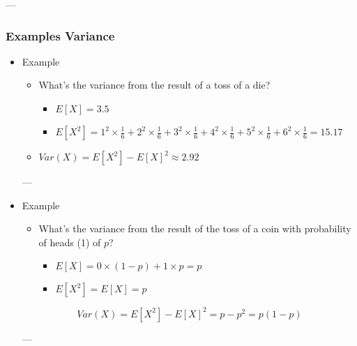 \documentclass[10pt,article]{article}
\begin{document}
---

\subsubsection{Examples Variance}
\label{sec:orgb14281d}
\begin{itemize}
\item Example
\label{sec:org10b3347}

\begin{itemize}
\item What's the variance from the result of a toss of a die?

\begin{itemize}
\item \(E[X] = 3.5\)
\item \(E[X^2] = 1 ^ 2 \times \frac{1}{6} + 2 ^ 2 \times \frac{1}{6} + 3 ^ 2 \times \frac{1}{6} + 4 ^ 2 \times \frac{1}{6} + 5 ^ 2 \times \frac{1}{6} + 6 ^ 2 \times \frac{1}{6} = 15.17\)
\end{itemize}

\item \(Var(X) = E[X^2] - E[X]^2 \approx 2.92\)
\end{itemize}

---

\item Example
\label{sec:org49547b1}

\begin{itemize}
\item What's the variance from the result of the toss of a coin with probability of heads (1) of \(p\)?

\begin{itemize}
\item \(E[X] = 0 \times (1 - p) + 1 \times p = p\)
\item \(E[X^2] = E[X] = p\)
\end{itemize}
\end{itemize}

$$Var(X) = E[X^2] - E[X]^2 = p - p^2 = p(1 - p)$$


---
\end{itemize}
\end{document}
